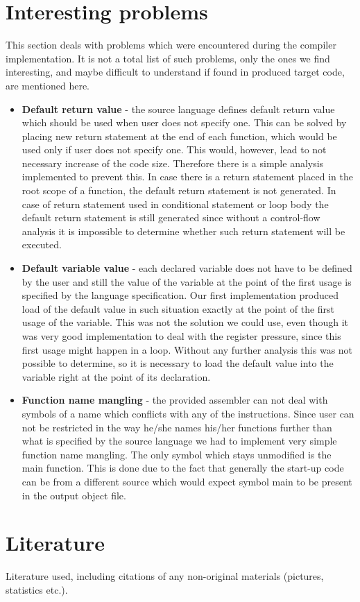 \section{Interesting problems}
This section deals with problems which were encountered during the compiler implementation. It is not a total list of such problems, only the ones we find interesting, and maybe difficult to understand if found in produced target code, are mentioned here.
\begin{itemize}
\item \textbf{Default return value} - the source language defines default return value which should be used when user does not specify one. This can be solved by placing new return statement at the end of each function, which would be used only if user does not specify one. This would, however, lead to not necessary increase of the code size. Therefore there is a simple analysis implemented to prevent this. In case there is a return statement placed in the root scope of a function, the default return statement is not generated. In case of return statement used in conditional statement or loop body the default return statement is still generated since without a control-flow analysis it is impossible to determine whether such return statement will be executed.
\item \textbf{Default variable value} - each declared variable does not have to be defined by the user and still the value of the variable at the point of the first usage is specified by the language specification. Our first implementation produced load of the default value in such situation exactly at the point of the first usage of the variable. This was not the solution we could use, even though it was very good implementation to deal with the register pressure, since this first usage might happen in a loop. Without any further analysis this was not possible to determine, so it is necessary to load the default value into the variable right at the point of its declaration.
\item \textbf{Function name mangling} - the provided assembler can not deal with symbols of a name which conflicts with any of the instructions. Since user can not be restricted in the way he/she names his/her functions further than what is specified by the source language we had to implement very simple function name mangling. The only symbol which stays unmodified is the main function. This is done due to the fact that generally the start-up code can be from a different source which would expect symbol main to be present in the output object file.
\end{itemize}

\section{Literature}
Literature used, including citations of any non-original materials (pictures, statistics
etc.).